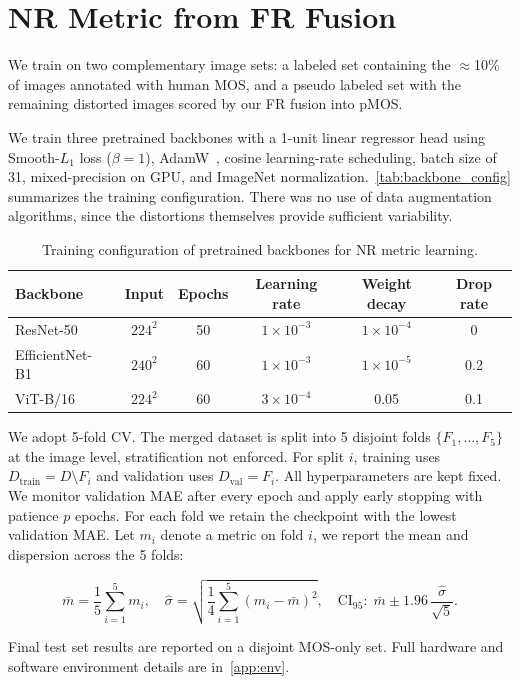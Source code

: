 \section{\acs{NR} Metric from \acs{FR} Fusion}\label{sec:3nr-model}

We train on two complementary image sets: a labeled set containing the $\approx$10\% of images annotated with human \acs{MOS}, and a pseudo labeled set with the remaining distorted images scored by our \acs{FR} fusion into \acs{pMOS}.

We train three pretrained backbones with a 1-unit linear regressor head using Smooth-$L_1$ loss ($\beta\!=\!1$), AdamW~\cite{adamw}, cosine learning-rate scheduling, batch size of 31, mixed-precision on GPU, and ImageNet normalization.~\autoref{tab:backbone_config} summarizes the training configuration. There was no use of data augmentation algorithms, since the distortions themselves provide sufficient variability.

\begin{table}[htbp]
    \centering
    \caption{Training configuration of pretrained backbones for \acs{NR} metric learning.}
    \label{tab:backbone_config}
    \begin{tabular}{lccccc}
        \hline
        \textbf{Backbone} & \textbf{Input} & \textbf{Epochs} & \textbf{Learning rate} & \textbf{Weight decay} & \textbf{Drop rate} \\
        \hline
        ResNet-50~\cite{resnet} & $224^{2}$ & 50 & $1\times 10^{-3}$ & $1\times 10^{-4}$ & 0 \\
        EfficientNet-B1~\cite{efficientnet} & $240^{2}$ & 60  & $1\times 10^{-3}$ & $1\times 10^{-5}$ & 0.2 \\
        ViT-B/16~\cite{vit} & $224^{2}$ & 60 & $3\times 10^{-4}$ & 0.05 & 0.1 \\
        \hline
    \end{tabular}
\end{table}

We adopt 5-fold \acf{CV}. The merged dataset is split into 5 disjoint folds $\{F_1,\dots,F_5\}$ at the image level, stratification not enforced. For split $i$, training uses $D_{\text{train}}=D\setminus F_i$ and validation uses $D_{\text{val}}=F_i$. All hyperparameters are kept fixed. We monitor validation \acs{MAE} after every epoch and apply early stopping with patience $p$ epochs. For each fold we retain the checkpoint with the lowest validation \acs{MAE}. Let $m_i$ denote a metric on fold $i$, we report the mean and dispersion across the 5 folds:

\begin{equation}
    \bar{m}=\frac{1}{5}\sum_{i=1}^{5} m_i,\quad
    \hat{\sigma}=\sqrt{\frac{1}{4}\sum_{i=1}^{5}(m_i-\bar{m})^2},\quad
    \text{CI}_{95}:\;\bar{m}\pm1.96\,\frac{\hat{\sigma}}{\sqrt{5}}.
\end{equation}

Final test set results are reported on a disjoint \acs{MOS}-only set. Full hardware and software environment details are in~\autoref{app:env}.
